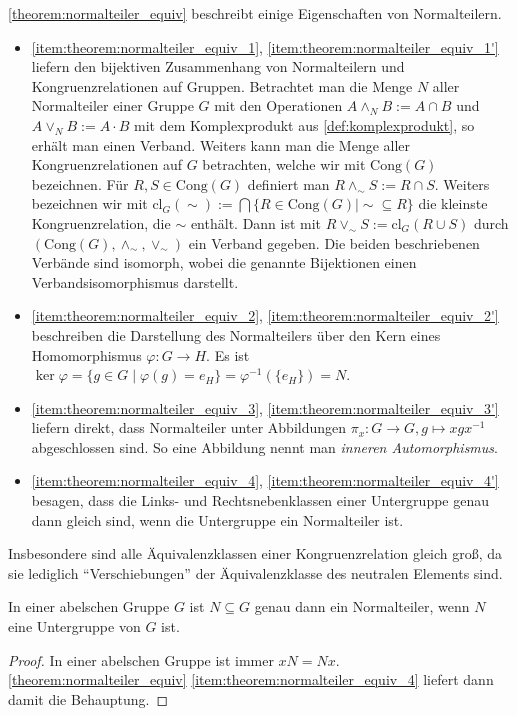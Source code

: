 \begin{remark}
    \cref{theorem:normalteiler_equiv} beschreibt einige Eigenschaften von Normalteilern.
    \begin{itemize}
        \item \ref*{item:theorem:normalteiler_equiv_1}, \ref*{item:theorem:normalteiler_equiv_1'} liefern den bijektiven Zusammenhang von Normalteilern und Kongruenzrelationen auf Gruppen. Betrachtet man die Menge $N$ aller Normalteiler einer Gruppe $G$ mit den Operationen $A\land_N B:=A\cap B$ und $A\lor_N B:=A\cdot B$ mit dem Komplexprodukt aus \cref{def:komplexprodukt}, so erhält man einen Verband. Weiters kann man die Menge aller Kongruenzrelationen auf $G$ betrachten, welche wir mit $\mathrm{Cong}(G)$ bezeichnen. Für $R,S\in \mathrm{Cong}(G)$ definiert man $R\land_\sim S:=R\cap S$. Weiters bezeichnen wir mit $\mathrm{cl}_G(\sim):=\bigcap\{R\in \mathrm{Cong}(G)\mid \sim\subseteq R\}$ die kleinste Kongruenzrelation, die $\sim$ enthält.
        Dann ist mit $R\lor_\sim S:=\mathrm{cl}_G(R\cup S)$ durch $(\mathrm{Cong}(G),\land_\sim,\lor_\sim)$ ein Verband gegeben. Die beiden beschriebenen Verbände sind isomorph, wobei die genannte Bijektionen einen Verbandsisomorphismus darstellt.
        
        \item \ref*{item:theorem:normalteiler_equiv_2}, \ref*{item:theorem:normalteiler_equiv_2'} beschreiben die Darstellung des Normalteilers über den Kern eines Homomorphismus $\varphi: G \to H$. Es ist $\ker \varphi = \{g \in G \mid \varphi(g) = e_H\} = \varphi^{-1}(\{e_H\}) = N$.
        \item \ref*{item:theorem:normalteiler_equiv_3}, \ref*{item:theorem:normalteiler_equiv_3'} liefern direkt, dass Normalteiler unter Abbildungen $\pi_x: G \to G, g \mapsto xgx^{-1}$ abgeschlossen sind. So eine Abbildung nennt man \emph{inneren Automorphismus}.
        \item \ref*{item:theorem:normalteiler_equiv_4}, \ref*{item:theorem:normalteiler_equiv_4'} besagen, dass die Links- und Rechtsnebenklassen einer Untergruppe genau dann gleich sind, wenn die Untergruppe ein Normalteiler ist.
    \end{itemize}

    Insbesondere sind alle Äquivalenzklassen einer Kongruenzrelation gleich groß, da sie lediglich ``Verschiebungen'' der Äquivalenzklasse des neutralen Elements sind.
\end{remark}

\begin{corollary} \label{corollary:abelsch-normalteiler-untergruppe}
    In einer abelschen Gruppe $G$ ist $N \subseteq G$ genau dann ein Normalteiler, wenn $N$ eine Untergruppe von $G$ ist.
\end{corollary}
\begin{proof}
    In einer abelschen Gruppe ist immer $xN = Nx$. \cref{theorem:normalteiler_equiv} \ref*{item:theorem:normalteiler_equiv_4} liefert dann damit die Behauptung.
\end{proof}

